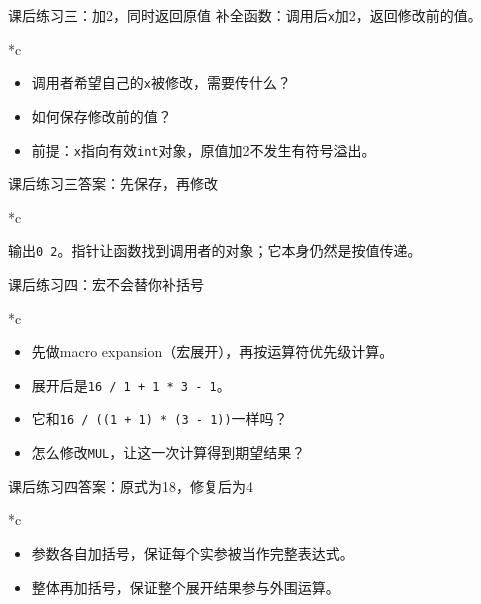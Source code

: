 \begin{frame}{课后练习三：加2，同时返回原值}
补全函数：调用后\texttt{x}加2，返回修改前的值。\begin{Code}*{c}\end{Code}\begin{itemize}
\item 调用者希望自己的\texttt{x}被修改，需要传什么？
\item 如何保存修改前的值？
\item 前提：\texttt{x}指向有效\texttt{int}对象，原值加2不发生有符号溢出。
\end{itemize}

\end{frame}

\begin{frame}{课后练习三答案：先保存，再修改}
\begin{Code}*{c}\end{Code}输出\texttt{0 2}。\alert{指针让函数找到调用者的对象；它本身仍然是按值传递。}
\end{frame}

\begin{frame}{课后练习四：宏不会替你补括号}
\begin{Code}*{c}\end{Code}\begin{itemize}
\item 先做macro expansion（宏展开），再按运算符优先级计算。
\item 展开后是\texttt{16 / 1 + 1 * 3 - 1}。
\item 它和\texttt{16 / ((1 + 1) * (3 - 1))}一样吗？
\item 怎么修改\texttt{MUL}，让这一次计算得到期望结果？
\end{itemize}

\end{frame}

\begin{frame}{课后练习四答案：原式为18，修复后为4}
\begin{Code}*{c}\end{Code}\begin{itemize}
\item 参数各自加括号，保证每个实参被当作完整表达式。
\item 整体再加括号，保证整个展开结果参与外围运算。
\end{itemize}

\end{frame}

